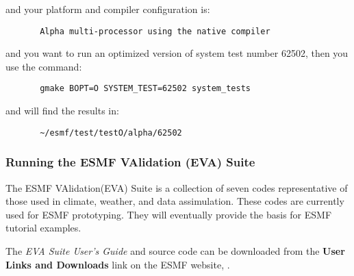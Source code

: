 and your platform and compiler configuration is:
\begin{verbatim}
       Alpha multi-processor using the native compiler
\end{verbatim}

and you want to run an optimized version of system test number 62502,
then you use the command:
\begin{verbatim}
       gmake BOPT=O SYSTEM_TEST=62502 system_tests
\end{verbatim}

and will find the results in:
\begin{verbatim}
       ~/esmf/test/testO/alpha/62502 
\end{verbatim}

\subsubsection{Running the ESMF VAlidation (EVA) Suite}
\label{EVATestDescription}

The ESMF VAlidation(EVA) Suite is a collection of seven codes representative of those used 
in climate, weather, and data assimulation. These codes are currently used for ESMF 
prototyping.  They will eventually provide the basis for ESMF tutorial examples.

The {\it EVA Suite User's Guide} and source code can be downloaded from the {\bf
User Links and Downloads} link on the ESMF website, 
.




























